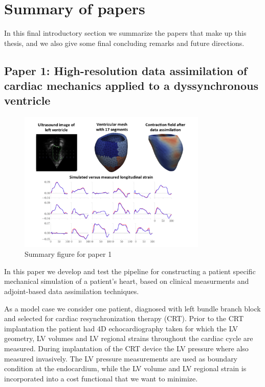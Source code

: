 
\section{Summary of papers}
\label{sec:summary}
In this final introductory section we summarize the papers that make
up this thesis, and we also give some final concluding remarks
and future directions. 

\subsection{Paper 1: High-resolution data assimilation of cardiac mechanics
  applied to a dyssynchronous ventricle}



\begin{figure}[htbp]
  \centering
    \includegraphics[width=0.8\textwidth]{chapters/introduction/figures/paper1}
\caption{Summary figure for paper 1}
\label{fig:paper1}
\end{figure}


In this paper we develop and test the pipeline for constructing a
patient specific mechanical simulation of a patient's heart, based on
clinical measurments and adjoint-based data assimilation
techniques.

As a model case we consider one patient, diagnosed with
left bundle branch block and selected for cardiac resynchronization
therapy (CRT). Prior to the CRT implantation the patient had 4D
echocardiography taken for which the LV geometry, LV volumes and LV
regional strains throughout the cardiac cycle are measured. During
implantation of the CRT device the LV pressure where also measured
invasively. The LV pressure measurements are used as boundary condition at the
endocardium, while the LV volume and LV regional strain is incorporated
into a cost functional that we want to minimize.


